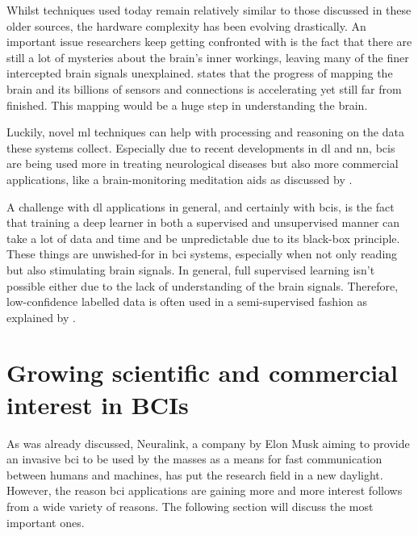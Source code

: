 Whilst techniques used today remain relatively similar to those discussed in these older sources, the hardware complexity has been evolving drastically.
An important issue researchers keep getting confronted with is the fact that there are still a lot of mysteries about the brain's inner workings, leaving many of the finer intercepted brain signals unexplained.
\citet{brainmapping} states that the progress of mapping the brain and its billions of sensors and connections is accelerating yet still far from finished.
This mapping would be a huge step in understanding the brain.

Luckily, novel \gls{ml} techniques can help with processing and reasoning on the data these systems collect.
Especially due to recent developments in \gls{dl} and \gls{nn}, \glspl{bci} are being used more in treating neurological diseases \citep{bci_diseases} but also more commercial applications, like a brain-monitoring meditation aids as discussed by \citet{interaxon_tests}.

A challenge with \gls{dl} applications in general, and certainly with \glspl{bci}, is the fact that training a deep learner in both a supervised and unsupervised manner can take a lot of data and time and be unpredictable due to its black-box principle.
These things are unwished-for in \gls{bci} systems, especially when not only reading but also stimulating brain signals.
In general, full supervised learning isn't possible either due to the lack of understanding of the brain signals.
Therefore, low-confidence labelled data is often used in a semi-supervised fashion as explained by \citet{deep_learn_low_label}.


\section{Growing scientific and commercial interest in BCIs}
\label{sec:bci_gaining_popularity}

As was already discussed, Neuralink, a company by Elon Musk aiming to provide an invasive \gls{bci} to be used by the masses as a means for fast communication between humans and machines, has put the research field in a new daylight.
However, the reason \gls{bci} applications are gaining more and more interest follows from a wide variety of reasons.
The following section will discuss the most important ones.


